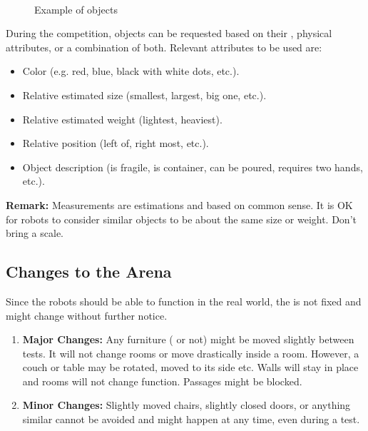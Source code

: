 \begin{figure}[H]
	\centering
	~
	~
	\caption{Example of objects}
	\label{fig:scenario_containers}
\end{figure}

\noindent During the competition, objects can be requested based on their \ObjectCategory{}, physical attributes, or a combination of both.
Relevant attributes to be used are:
\begin{itemize}
	\item Color (e.g. red, blue, black with white dots, etc.).
	\item Relative estimated size (smallest, largest, big one, etc.).
	\item Relative estimated weight (lightest, heaviest).
	\item Relative position (left of, right most, etc.).
	\item Object description (is fragile, is container, can be poured, requires two hands, etc.).
\end{itemize}

\noindent\textbf{Remark:} Measurements are estimations and based on common sense. It is OK for robots to consider similar objects to be about the same size or weight. Don't bring a scale.


\subsection{Changes to the Arena}
\label{sec:rules:scenario:changes}
Since the robots should be able to function in the real world, the \Arena{} is not fixed and might change without further notice.
\begin{enumerate}
	\item \textbf{Major Changes:}
	Any furniture (\PredefinedLocation{} or not) might be moved slightly between tests. It will not change rooms or move drastically inside a room. However, a couch or table may be rotated, moved to its side etc. Walls will stay in place and rooms will not change function. Passages might be blocked.
	
	\item \textbf{Minor Changes:} Slightly moved chairs, slightly closed doors, or anything similar cannot be avoided and might happen at any time, even during a test.
\end{enumerate}

